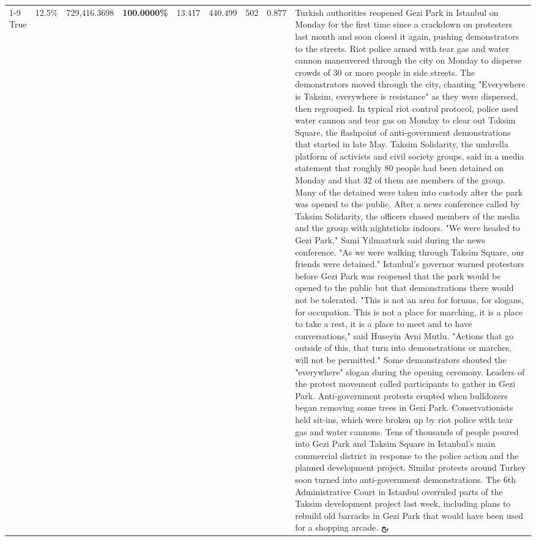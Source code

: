 \begin{table}[H]
\begin{tabular}{lllrlllll}
\cline{1-9}
True & 12.5\% & 729,416.3698 & \bfseries \color{red} 100.0000\% & 13.417 & 440.499 & 502 & 0.877 & Turkish authorities reopened Gezi Park in Istanbul on Monday for the first time since a crackdown on protesters last month and soon closed it again, pushing demonstrators to the streets. Riot police armed with tear gas and water cannon maneuvered through the city on Monday to disperse crowds of 30 or more people in side streets. The demonstrators moved through the city, chanting "Everywhere is Taksim, everywhere is resistance" as they were dispersed, then regrouped. In typical riot control protocol, police used water cannon and tear gas on Monday to clear out Taksim Square, the flashpoint of anti-government demonstrations that started in late May. Taksim Solidarity, the umbrella platform of activists and civil society groups, said in a media statement that roughly 80 people had been detained on Monday and that 32 of them are members of the group. Many of the detained were taken into custody after the park was opened to the public. After a news conference called by Taksim Solidarity, the officers chased members of the media and the group with nightsticks indoors. "We were headed to Gezi Park," Sami Yilmazturk said during the news conference. "As we were walking through Taksim Square, our friends were detained." Istanbul's governor warned protestors before Gezi Park was reopened that the park would be opened to the public but that demonstrations there would not be tolerated. "This is not an area for forums, for slogans, for occupation. This is not a place for marching, it is a place to take a rest, it is a place to meet and to have conversations," said Huseyin Avni Mutlu. "Actions that go outside of this, that turn into demonstrations or marches, will not be permitted." Some demonstrators shouted the "everywhere" slogan during the opening ceremony. Leaders of the protest movement called participants to gather in Gezi Park. Anti-government protests erupted when bulldozers began removing some trees in Gezi Park. Conservationists held sit-ins, which were broken up by riot police with tear gas and water cannons. Tens of thousands of people poured into Gezi Park and Taksim Square in Istanbul's main commercial district in response to the police action and the planned development project. Similar protests around Turkey soon turned into anti-government demonstrations. The 6th Administrative Court in Istanbul overruled parts of the Taksim development project last week, including plans to rebuild old barracks in Gezi Park that would have been used for a shopping arcade. بخ \\

\end{tabular}
\end{table}
